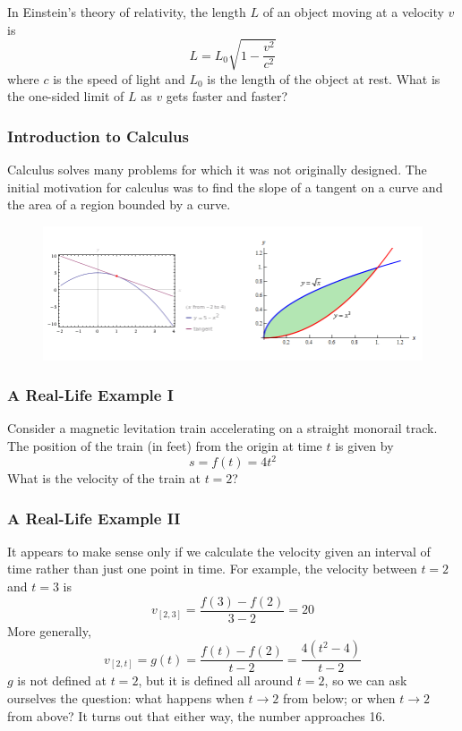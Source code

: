 \documentclass[xcolor=dvipsnames]{beamer}
\begin{document}
\begin{frame}
In Einstein's theory of relativity, the length $L$ of an object moving
at a velocity $v$ is 
\begin{equation}
  \label{eq:aumiepha}
L=L_{0}\sqrt{1-\frac{v^{2}}{c^{2}}}
\end{equation}
where $c$ is the speed of light and $L_{0}$ is the length of the
object at rest. What is the one-sided limit of $L$ as $v$ gets
faster and faster?
\end{frame}

\begin{frame}
  \frametitle{Introduction to Calculus}
\alert{Calculus} solves many problems for which it was not originally
designed. The initial motivation for calculus was to find the slope of
a tangent on a curve and the area of a region bounded by a curve.
  \begin{figure}[h]
    \includegraphics[scale=.35]{./regiontangent.png}
  \end{figure}
\end{frame}

\begin{frame}
  \frametitle{A Real-Life Example I}
Consider a magnetic levitation train accelerating on a straight
monorail track. The position of the train (in feet) from the origin at
time $t$ is given by
\begin{equation}
  \label{eq:pupibahk}
  s=f(t)=4t^{2}
\end{equation}
What is the velocity of the train at $t=2$?
\end{frame}

\begin{frame}
  \frametitle{A Real-Life Example II}
It appears to make sense only if we calculate the velocity given an
interval of time rather than just one point in time. For example, the
velocity between $t=2$ and $t=3$ is 
\begin{equation}
  \label{eq:einohkie}
  v_{[2,3]}=\frac{f(3)-f(2)}{3-2}=20
\end{equation}
More generally,
\begin{equation}
  \label{eq:phaedais}
  v_{[2,t]}=g(t)=\frac{f(t)-f(2)}{t-2}=\frac{4(t^{2}-4)}{t-2}
\end{equation}
$g$ is not defined at $t=2$, but it is defined all around $t=2$, so we
can ask ourselves the question: what happens when $t\rightarrow{}2$
from below; or when $t\rightarrow{}2$ from above? It turns out that
either way, the number approaches 16.
\end{frame}
\end{document}
